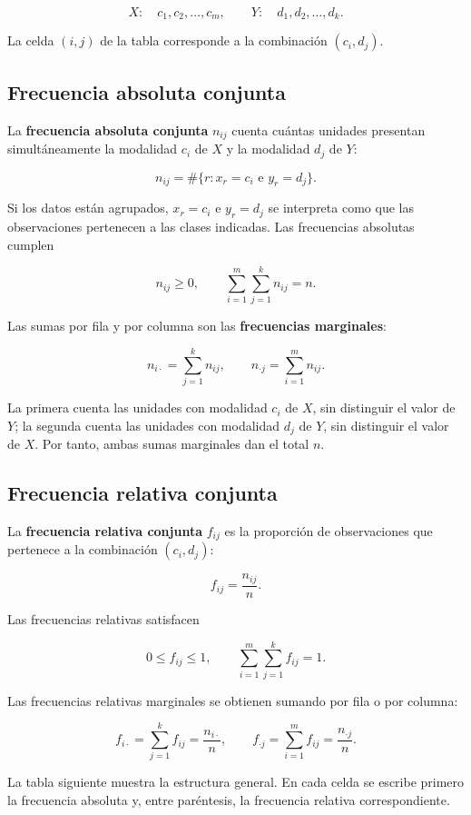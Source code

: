 $$
X:\quad c_1,c_2,\ldots,c_m,\qquad Y:\quad d_1,d_2,\ldots,d_k.
$$

La celda $(i,j)$ de la tabla corresponde a la combinación $(c_i,d_j)$.

\subsection{Frecuencia absoluta conjunta}

La \textbf{frecuencia absoluta conjunta} $n_{ij}$ cuenta cuántas unidades presentan simultáneamente la modalidad $c_i$ de $X$ y la modalidad $d_j$ de $Y$:

$$
n_{ij}=\#\{r: x_r=c_i\text{ e }y_r=d_j\}.
$$

Si los datos están agrupados, $x_r=c_i$ e $y_r=d_j$ se interpreta como que las observaciones pertenecen a las clases indicadas. Las frecuencias absolutas cumplen

$$
n_{ij}\geq 0,\qquad \sum_{i=1}^{m}\sum_{j=1}^{k} n_{ij}=n.
$$

Las sumas por fila y por columna son las \textbf{frecuencias marginales}:

$$
n_{i\cdot}=\sum_{j=1}^{k}n_{ij},\qquad n_{\cdot j}=\sum_{i=1}^{m}n_{ij}.
$$

La primera cuenta las unidades con modalidad $c_i$ de $X$, sin distinguir el valor de $Y$; la segunda cuenta las unidades con modalidad $d_j$ de $Y$, sin distinguir el valor de $X$. Por tanto, ambas sumas marginales dan el total $n$.

\subsection{Frecuencia relativa conjunta}

La \textbf{frecuencia relativa conjunta} $f_{ij}$ es la proporción de observaciones que pertenece a la combinación $(c_i,d_j)$:

$$
f_{ij}=\frac{n_{ij}}{n}.
$$

Las frecuencias relativas satisfacen

$$
0\leq f_{ij}\leq 1,\qquad \sum_{i=1}^{m}\sum_{j=1}^{k} f_{ij}=1.
$$

Las frecuencias relativas marginales se obtienen sumando por fila o por columna:

$$
f_{i\cdot}=\sum_{j=1}^{k}f_{ij}=\frac{n_{i\cdot}}{n},\qquad
f_{\cdot j}=\sum_{i=1}^{m}f_{ij}=\frac{n_{\cdot j}}{n}.
$$

La tabla siguiente muestra la estructura general. En cada celda se escribe primero la frecuencia absoluta y, entre paréntesis, la frecuencia relativa correspondiente.


